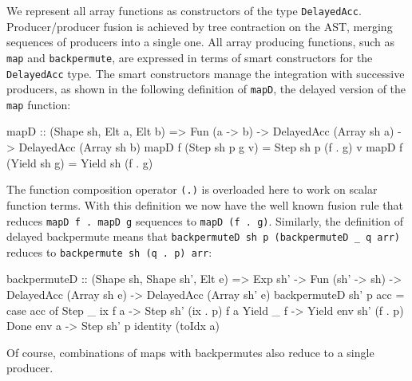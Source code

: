 We represent all array functions as constructors of the type \texttt{DelayedAcc}. Producer/producer fusion is achieved by tree contraction on the AST, merging sequences of producers into a single one. All array producing functions, such as \texttt{map} and \texttt{backpermute}, are expressed in terms of smart constructors for the \texttt{DelayedAcc} type. The smart constructors manage the integration with successive producers, as shown in the following definition of \texttt{mapD}, the delayed version of the \texttt{map} function:
%
\begin{code}
  mapD :: (Shape sh, Elt a, Elt b)
       => Fun (a -> b)
       -> DelayedAcc (Array sh a)
       -> DelayedAcc (Array sh b)
  mapD f (Step  sh p g v) = Step  sh p (f . g) v
  mapD f (Yield sh g)     = Yield sh   (f . g)
\end{code}
%
The function composition operator \texttt{(.)} is overloaded here to work on scalar function terms. With this definition we now have the well known fusion rule that reduces \texttt{mapD f . mapD g} sequences to \texttt{mapD (f . g)}. Similarly, the definition of delayed backpermute means that \mbox{\texttt{backpermuteD sh p (backpermuteD \_ q arr)}} reduces to \texttt{backpermute sh (q . p) arr}:
\begin{code}
backpermuteD
    :: (Shape sh, Shape sh', Elt e)
    => Exp        sh'
    -> Fun        (sh' -> sh)
    -> DelayedAcc (Array sh  e)
    -> DelayedAcc (Array sh' e)
backpermuteD sh' p acc = case acc of
  Step  _ ix f a  -> Step  sh' (ix . p) f a
  Yield _ f       -> Yield env sh' (f . p)
  Done  env a     -> Step  sh' p identity (toIdx a)
\end{code}
Of course, combinations of maps with backpermutes also reduce to a single producer. %

